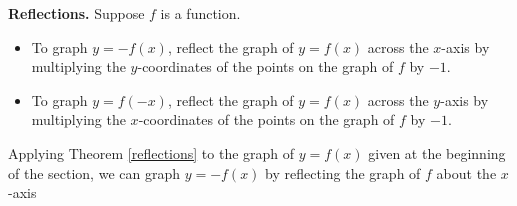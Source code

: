 \smallskip

\colorbox{ResultColor}{\bbm


\begin{thm} \label{reflections}\textbf{Reflections.}  Suppose $f$ is a function. 

\begin{itemize}

\item To graph $y=-f(x)$, reflect the graph of $y=f(x)$ across the $x$-axis by multiplying the $y$-coordinates of the points on the graph of $f$ by $-1$.

\item To graph $y=f(-x)$, reflect the graph of $y=f(x)$ across the $y$-axis by multiplying the $x$-coordinates of the points on the graph of $f$ by $-1$.

\end{itemize}

\end{thm}

\ebm}

\smallskip

Applying Theorem \ref{reflections} to the graph of $y=f(x)$ given at the beginning of the section, we can graph $y=-f(x)$ by reflecting the graph of $f$ about the $x$-axis

